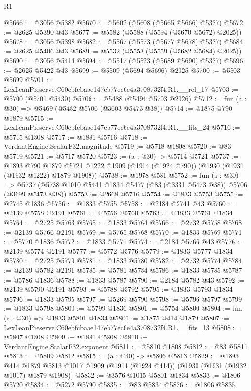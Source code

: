 \begin{lexlean}{R1}
\begin{coremodule}
@5666 := @3056 @5382
@5670 := @5602 (@5608 (@5665 @5666) @5337)
@5672 := @2625 @5390 @43
@5677 := @5582 (@5588 (@5594 (@5670 @5672) @2025))
@5678 := @3056 @5398
@5682 := @5567 (@5573 (@5677 @5678) @5337)
@5684 := @2625 @5406 @43
@5689 := @5532 (@5553 (@5559 (@5682 @5684) @2025))
@5690 := @3056 @5414
@5694 := @5517 (@5523 (@5689 @5690) @5337)
@5696 := @2625 @5422 @43
@5699 := @5509 (@5694 @5696) @2025
@5700 := @5503 @5699
@5701 := LexLeanPreserve.C60ebfcbaae147eb77ec6e4a3708732f4.R1.__rel_17
@5703 := @5700 (@5701 @5430)
@5706 := @5488 (@5494 @5703 @2026)
@5712 := fun (a : @30) => @5469 (@5482 @5706 (@3603 @5473 @38))
@5714 := @1875 @790 @1879
@5715 := LexLeanPreserve.C60ebfcbaae147eb77ec6e4a3708732f4.R1.__fits_24
@5716 := @5715 @1808
@5717 := @1881 @5716
@5718 := VerdantEngine.ScalarF32.magnitude
@5719 := @5718 @1808
@5720 := @83 @5719
@5721 := @5717 @5720
@5723 := (a : @30) -> @5714 @5721
@5737 := @1893
    @790
    @1879
    @5721
    @1222
    @1909
    (@1914 (@1924 @790))
    (@1930 (@1931 (@1932 @1222) @1879 @1908))
@5738 := @1978 @581
@5752 := fun (a : @30) =>
  @5737 (@5738 @1010 @5441 @1834 @5477 (@83 (@3331 @5473 @38)) @5706 (@3699 @5473 @38))
@5753 := @2668 @5716
@5754 := @1833 @5753
@5755 := @2745 @1836
@5756 := @1833 @5755
@5758 := @2184 @2741 @43
@5760 := @2139 @5758 @2191
@5761 := @5756 @5760
@5763 := @1833 @5761 @1834
@5764 := @2725 @5763
@5765 := @1833 @5764
@5766 := @2732 @5758
@5768 := @2139 @5766 @2191
@5769 := @5765 @5768
@5770 := @1833 @5769
@5771 := @5770 @1836
@5772 := @1833 @5771
@5774 := @2184 @5766 @43
@5776 := @2139 @5774 @2191
@5777 := @5772 @5776
@5779 := @1833 @5777 @1834
@5780 := @2725 @5779
@5781 := @1833 @5780
@5782 := @2732 @5774
@5784 := @2139 @5782 @2191
@5785 := @5781 @5784
@5786 := @1833 @5785
@5787 := @5786 @1836
@5788 := @1833 @5787
@5790 := @2184 @5782 @43
@5792 := @2139 @5790 @2191
@5793 := @5788 @5792
@5795 := @1833 @5793 @1834
@5796 := @1833 @5795
@5797 := @5269 @5790
@5798 := @5796 @5797
@5799 := @1833 @5798
@5800 := @5799 @1836
@5801 := @5754 @5800
@5804 := fun (a : @30) => @1833 @5801 @1834
@5806 := @1875 @414 @1879
@5807 := LexLeanPreserve.C60ebfcbaae147eb77ec6e4a3708732f4.R1.__fits_13
@5808 := @5807 @1808
@5809 := @1881 @5808
@5810 := VerdantEngine.ScalarF32.exponent
@5811 := @5810 @1808
@5812 := @83 @5811
@5813 := @5809 @5812
@5815 := (a : @30) -> @5806 @5813
@5829 := @1893
    @414
    @1879
    @5813
    @1017
    @1909
    (@1914 (@1924 @414))
    (@1930 (@1931 (@1932 @1017) @1879 @1908))
@5832 := @3576 @1015 @5801 @1834
@5833 := @1806 @5720
@5834 := @5272 @5790
@5835 := @83 @5834
@5836 := @1806 @5835

\end{coremodule}
\end{lexlean}

